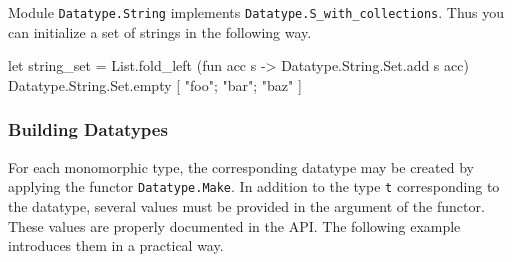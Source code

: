 \begin{example}
Module \texttt{Datatype.String} implements
\texttt{Datatype.S\_with\_collections}. Thus you can initialize a set of strings
in the following way.
\begin{ocamlcode}
let string_set = 
  List.fold_left 
    (fun acc s -> Datatype.String.Set.add s acc)
    Datatype.String.Set.empty 
    [ "foo"; "bar"; "baz" ]
\end{ocamlcode}
\end{example}

\subsubsection{Building Datatypes}

For each monomorphic type, the corresponding datatype may be created by applying
the functor \texttt{Datatype.Make}. In addition to the
type \texttt{t} corresponding to the datatype, several values must be provided
in the argument of the functor. These values are properly documented in the
\framac API. The following example introduces them in a practical way.
